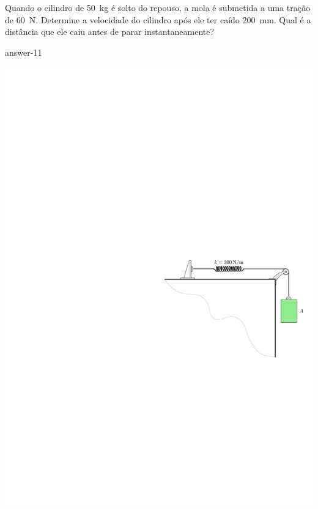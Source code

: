 
\item Quando o cilindro de \SI{50}{\kilogram} é solto do repouso, a mola é submetida a uma tração de \SI{60}{\newton}. Determine a velocidade do cilindro após ele ter caído \SI{200}{\milli\meter}. Qual é a distância que ele caiu antes de parar instantaneamente?

{answer-11}

\vspace{3cm}
\begin{flushleft}
	\includegraphics[scale=1.3]{images/draw_11.pdf}
\end{flushleft}